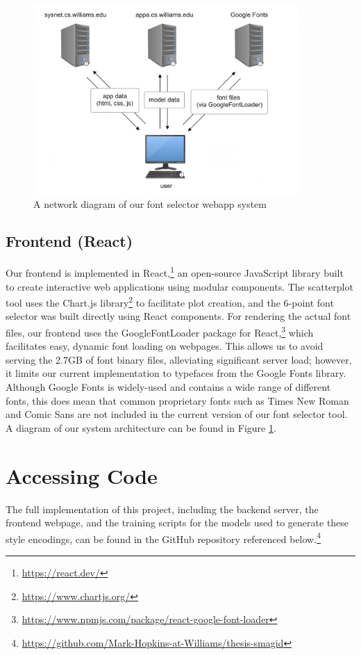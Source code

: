 \begin{figure}[]
    \centering
    \includegraphics[width=0.9\textwidth]{images/system-diagram.png}
    \caption{A network diagram of our font selector webapp system}
    \label{fig:system-diagram}
\end{figure}

\subsection{Frontend (React)} \label{frontend}

Our frontend is implemented in React,\footnote{\url{https://react.dev/}} an open-source JavaScript library built to create interactive web applications using modular components. The scatterplot tool uses the Chart.js library\footnote{\url{https://www.chartjs.org/}} to facilitate plot creation, and the 6-point font selector was built directly using React components. For rendering the actual font files, our frontend uses the GoogleFontLoader package for React,\footnote{\url{https://www.npmjs.com/package/react-google-font-loader}} which facilitates easy, dynamic font loading on webpages. This allows us to avoid serving the 2.7GB of font binary files, alleviating significant server load; however, it limits our current implementation to typefaces from the Google Fonts library. Although Google Fonts is widely-used and contains a wide range of different fonts, this does mean that common proprietary fonts such as Times New Roman and Comic Sans are not included in the current version of our font selector tool. A diagram of our system architecture can be found in Figure \ref{fig:system-diagram}.

\section{Accessing Code}

The full implementation of this project, including the backend server, the frontend webpage, and the training scripts for the models used to generate these style encodings, can be found in the GitHub repository referenced below.\footnote{\url{https://github.com/Mark-Hopkins-at-Williams/thesis-smagid}}